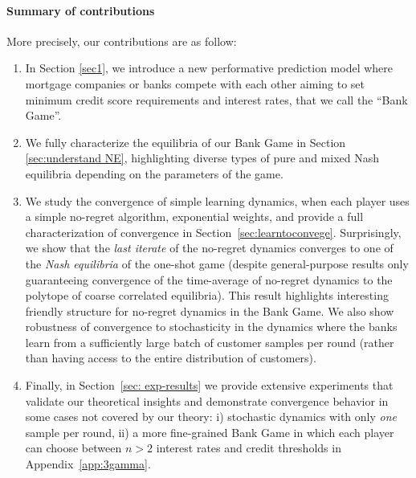 \paragraph{Summary of contributions} More precisely, our contributions are as follow: 
\begin{enumerate}
\item In Section \ref{sec1}, we introduce a new performative prediction model where mortgage companies or banks compete with each other aiming to set minimum credit score requirements and interest rates, that we call the ``Bank Game''.

\item We fully characterize the equilibria of our Bank Game in Section \ref{sec:understand NE}, highlighting diverse types of pure and mixed Nash equilibria depending on the parameters of the game.
\item We study the convergence of simple learning dynamics, when each player uses a simple no-regret algorithm, exponential weights, and provide a full characterization of convergence in Section~\ref{sec:learntoconvege}.
Surprisingly, we show that the \emph{last iterate} of the no-regret dynamics converges to one of the \emph{Nash equilibria} of the one-shot game (despite general-purpose results only guaranteeing convergence of the time-average of no-regret dynamics to the polytope of coarse correlated equilibria).
This result highlights interesting friendly structure for no-regret dynamics in the Bank Game.
We also show robustness of convergence to stochasticity in the dynamics where the banks learn from a sufficiently large batch of customer samples per round (rather than having access to the entire distribution of customers).
\item Finally, in Section~\ref{sec: exp-results} we provide extensive experiments that validate our theoretical insights and demonstrate convergence behavior in some cases not covered by our theory: i) stochastic dynamics with only \emph{one} sample per round, ii) a more fine-grained Bank Game in which each player can choose between $n > 2$ interest rates and credit thresholds in Appendix~\ref{app:3gamma}.
\end{enumerate}

